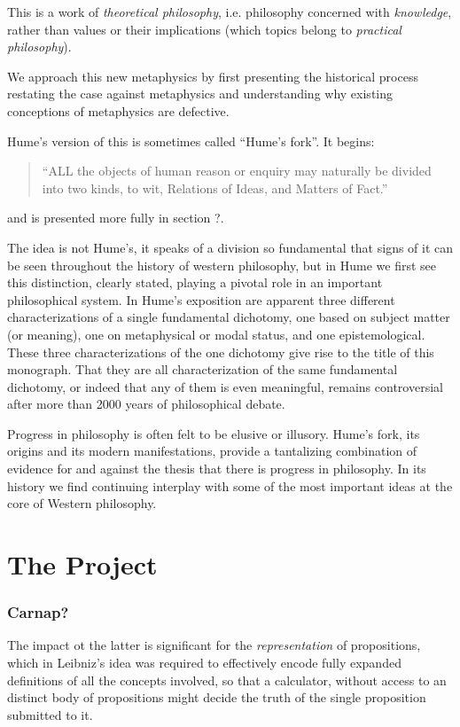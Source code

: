This is a work of {\it theoretical philosophy}, i.e. philosophy concerned with {\it knowledge}, rather than values or their implications (which topics belong to {\it practical philosophy}).

We approach this new metaphysics by first presenting the historical process restating the case against metaphysics and understanding why existing conceptions of metaphysics are defective.

Hume's version of this is sometimes called ``Hume's fork''.
It begins:

\begin{quote}
``ALL the objects of human reason or enquiry may naturally be divided into two kinds, to wit, Relations of Ideas, and Matters of Fact.''
\end{quote}

and is presented more fully in section ?.

The idea is not Hume's, it speaks of a division so fundamental that signs of it can be seen throughout the history of western philosophy, but in Hume we first see this distinction, clearly stated, playing a pivotal role in an important philosophical system.
In Hume's exposition are apparent three different characterizations of a single fundamental dichotomy, one based on subject matter (or meaning), one on metaphysical or modal status, and one epistemological.
These three characterizations of the one dichotomy give rise to the title of this monograph.
That they are all characterization of the same fundamental dichotomy, or indeed that any of them is even meaningful, remains controversial after more than 2000 years of philosophical debate. 

Progress in philosophy is often felt to be elusive or illusory.
Hume's fork, its origins and its modern manifestations, provide a tantalizing combination of evidence for and against the thesis that there is progress in philosophy.
In its history we find continuing interplay with some of the most important ideas at the core of Western philosophy.

\chapter{The Project}
\subsection{Carnap?}

The impact ot the latter is significant for the \emph{representation} of propositions, which in Leibniz's idea was required to effectively encode fully expanded definitions of all the concepts involved, so that a calculator, without access to an distinct body of propositions might decide the truth of the single proposition submitted to it.


